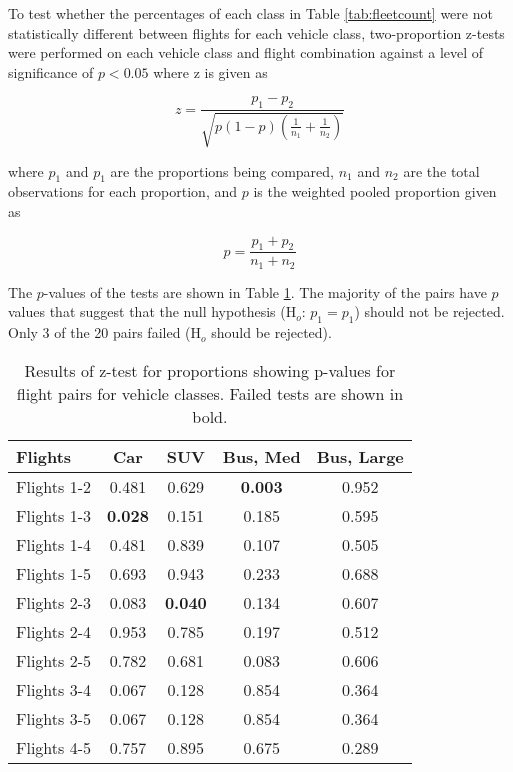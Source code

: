 To test whether the percentages of each class in Table \ref{tab:fleetcount} were not statistically different between flights for each vehicle class, two-proportion z-tests were performed on each vehicle class and flight combination against a level of significance of $p < 0.05$ where z is given as

\begin{equation}
z = \frac{p_{1}-p_{2}}{\sqrt{p(1-p)\left ( \frac{1}{n_{1}}+\frac{1}{n_{2}} \right )}}
\end{equation}

\noindent
where $p_{1}$ and $p_{1}$ are the proportions being compared, $n_{1}$ and $n_{2}$ are the total observations for each proportion, and $p$ is the weighted pooled proportion given as

\begin{equation}
p = \frac{p_{1}+p_{2}}{n_{1}+n_{2}}
\end{equation}

The $p$-values of the tests are shown in Table \ref{tab:ztestprop}. The majority of the pairs have $p$ values that suggest that the null hypothesis (H$_{o}$: $p_{1} = p_{1}$) should not be rejected. Only 3 of the 20 pairs failed (H$_{o}$ should be rejected).

\begin{table}[H]
\centering
\caption{Results of z-test for proportions showing p-values for flight pairs for vehicle classes. Failed tests are shown in bold.}
\label{tab:ztestprop}
\begin{tabular}{@{}lcccc@{}}
\toprule
\textbf{Flights} & \textbf{Car} & \textbf{SUV} & \textbf{Bus, Med} & \textbf{Bus, Large} \\ \midrule
Flights 1-2 & 0.481 & 0.629 & \textbf{0.003} & 0.952 \\
Flights 1-3 & \textbf{0.028} & 0.151 & 0.185 & 0.595 \\
Flights 1-4 & 0.481 & 0.839 & 0.107 & 0.505 \\
Flights 1-5 & 0.693 & 0.943 & 0.233 & 0.688 \\
Flights 2-3 & 0.083 & \textbf{0.040} & 0.134 & 0.607 \\
Flights 2-4 & 0.953 & 0.785 & 0.197 & 0.512 \\
Flights 2-5 & 0.782 & 0.681 & 0.083 & 0.606 \\
Flights 3-4 & 0.067 & 0.128 & 0.854 & 0.364 \\
Flights 3-5 & 0.067 & 0.128 & 0.854 & 0.364 \\
Flights 4-5 & 0.757 & 0.895 & 0.675 & 0.289 \\ \bottomrule
\end{tabular}
\end{table}

